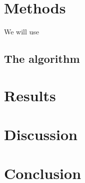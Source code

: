 \documentclass[english,notitlepage,reprint,nofootinbib]{revtex4-2}  %
\begin{document}
	
	
	\section{Methods}\label{sec:methods}
	We will use

	
	\subsection*{The algorithm}\label{sec:algorithm}

	\section{Results}\label{sec:results}

	
	
	\section{Discussion}\label{sec:discussion}

	
	\section{Conclusion}\label{sec:conclusion}

	\onecolumngrid
	
	
	
	
\end{document}
